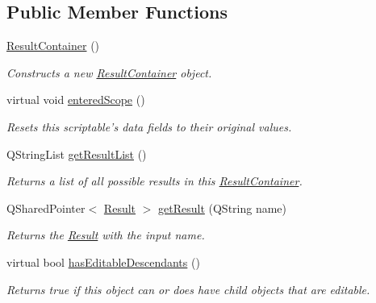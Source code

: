 \subsection*{Public Member Functions}
\begin{DoxyCompactItemize}
\item 
\hyperlink{class_picto_1_1_result_container_a4344b2309c82a06690a5d23f6bcb6ba4}{Result\-Container} ()
\begin{DoxyCompactList}\small\item\em Constructs a new \hyperlink{class_picto_1_1_result_container}{Result\-Container} object. \end{DoxyCompactList}\item 
virtual void \hyperlink{class_picto_1_1_result_container_afdddccb655674584da534256d7336545}{entered\-Scope} ()
\begin{DoxyCompactList}\small\item\em Resets this scriptable's data fields to their original values. \end{DoxyCompactList}\item 
\hypertarget{class_picto_1_1_result_container_a2e9cbc4c28db47285748e85594a55b87}{Q\-String\-List \hyperlink{class_picto_1_1_result_container_a2e9cbc4c28db47285748e85594a55b87}{get\-Result\-List} ()}\label{class_picto_1_1_result_container_a2e9cbc4c28db47285748e85594a55b87}

\begin{DoxyCompactList}\small\item\em Returns a list of all possible results in this \hyperlink{class_picto_1_1_result_container}{Result\-Container}. \end{DoxyCompactList}\item 
\hypertarget{class_picto_1_1_result_container_a559fc64ee804dd9c4d4278716aff4c81}{Q\-Shared\-Pointer$<$ \hyperlink{class_picto_1_1_result}{Result} $>$ \hyperlink{class_picto_1_1_result_container_a559fc64ee804dd9c4d4278716aff4c81}{get\-Result} (Q\-String name)}\label{class_picto_1_1_result_container_a559fc64ee804dd9c4d4278716aff4c81}

\begin{DoxyCompactList}\small\item\em Returns the \hyperlink{class_picto_1_1_result}{Result} with the input name. \end{DoxyCompactList}\item 
virtual bool \hyperlink{class_picto_1_1_result_container_af44cb41e834b9975f4a2d5e94609092c}{has\-Editable\-Descendants} ()
\begin{DoxyCompactList}\small\item\em Returns true if this object can or does have child objects that are editable. \end{DoxyCompactList}\end{DoxyCompactItemize}
